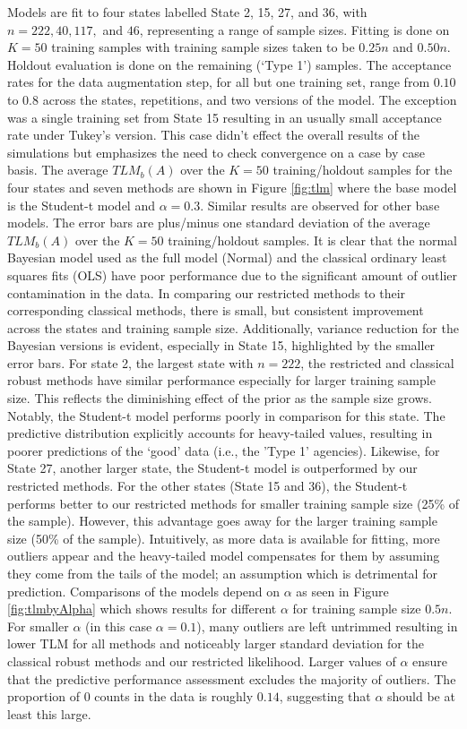 \documentclass[ba]{imsart}
\begin{document}
Models are fit to four states labelled State 2, 15, 27, and 36, with $n = 222, 40, 117,$ and $46$, representing a range of sample sizes. Fitting is done on $K = 50$ training samples with training sample sizes taken to be $0.25n$ and $0.50n$. Holdout evaluation is done on the remaining (`Type 1') samples. The acceptance rates for  the data augmentation step, for all but one training set, range from $0.10$ to $0.8$ across the states, repetitions, and two versions of the model. The exception was a single training set from State 15 resulting in an usually small acceptance rate under Tukey's version. This case didn't effect the overall results of the simulations but emphasizes the need to check convergence on a case by case basis. The average $TLM_b(A)$ over the $K = 50$ training/holdout samples for the four states and seven methods are shown in Figure \ref{fig:tlm} where the base model is the Student-t model and $\alpha = 0.3$. Similar results are observed for other base models. The error bars are plus/minus one standard deviation of the average $TLM_b(A)$ over the $K = 50$  training/holdout samples. It is clear that the normal Bayesian model used as the full model (Normal) and the classical ordinary least squares fits (OLS) have poor performance due to the significant amount of outlier contamination in the data. In comparing our restricted methods to their corresponding classical methods, there is small, but consistent improvement across the states and training sample size. Additionally, variance reduction for the Bayesian versions is evident, especially in State 15, highlighted by the smaller error bars. For state 2, the largest state with $n = 222$, the restricted and classical robust methods have similar performance especially for larger training sample size. This reflects the diminishing effect of the prior as the sample size grows. Notably, the Student-t model performs poorly in comparison for this state. The predictive distribution explicitly accounts for heavy-tailed values, resulting in poorer predictions of the `good' data (i.e., the 'Type 1' agencies). Likewise, for State 27, another larger state, the Student-t model is outperformed by our restricted methods.   For the other states (State 15 and 36), the Student-t performs better to our restricted methods for smaller training sample size (25\% of the sample). However, this advantage goes away for the larger training sample size (50\% of the sample). Intuitively, as more data is available for fitting, more outliers appear and the heavy-tailed model compensates for them by assuming they come from the tails of the model; an assumption which is detrimental for prediction. Comparisons of the models depend on $\alpha$ as seen in Figure \ref{fig:tlmbyAlpha} which shows results for different $\alpha$ for training sample size $0.5n$. For smaller $\alpha$ (in this case $\alpha = 0.1$), many outliers are left untrimmed resulting in lower TLM  for all methods and noticeably larger standard deviation for the classical robust methods and our restricted likelihood. Larger values of $\alpha$ ensure that the predictive performance assessment excludes the majority of outliers. The proportion of $0$ counts in the data is roughly $0.14$, suggesting that $\alpha$ should be at least this large. 
\end{document}
